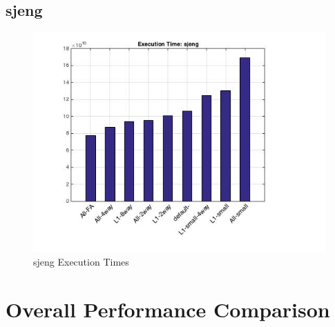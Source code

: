 \documentclass[11pt,titlepage]{article}
\begin{document}
    \subsection{sjeng}
	\begin{figure}[H]
            \centering
            \includegraphics[scale=0.75]{etsjeng}
            \caption{sjeng Execution Times}
            \label{fig:etsjeng}
        \end{figure}

\section{Overall Performance Comparison}
\end{document}
